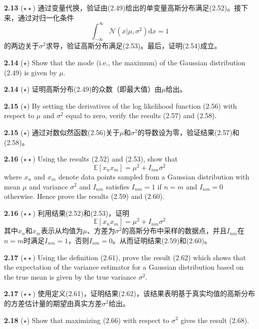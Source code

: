 \documentclass{article}
\begin{document}
\textbf{2.13} ($\star\star$) 通过变量代换，验证由(2.49)给出的单变量高斯分布满足(2.52)。接下来，通过对归一化条件
\begin{equation}
\int_{-\infty}^{\infty} \mathcal{N}\left(x | \mu, \sigma^{2}\right) \mathrm{d} x=1
\tag{2.127}
\end{equation}
的两边关于$\sigma^{2}$求导，验证高斯分布满足(2.53)。最后，证明(2.54)成立。

\textbf{2.14} ($\star$) Show that the mode (i.e., the maximum) of the Gaussian distribution (2.49) is given by $\mu$.

\textbf{2.14} ($\star$) 证明高斯分布(2.49)的众数（即最大值）由$\mu$给出。

\textbf{2.15} ($\star$) By setting the derivatives of the log likelihood function (2.56) with respect to $\mu$ and $\sigma^{2}$ equal to zero, verify the results (2.57) and (2.58).

\textbf{2.15} ($\star$) 通过对数似然函数(2.56)关于$\mu$和$\sigma^{2}$的导数设为零，验证结果(2.57)和(2.58)。

\textbf{2.16} ($\star\star$) Using the results (2.52) and (2.53), show that
\begin{equation}
\mathbb{E}\left[x_{n} x_{m}\right]=\mu^{2}+I_{n m} \sigma^{2}
\tag{2.128}
\end{equation}
where $x_{n}$ and $x_{m}$ denote data points sampled from a Gaussian distribution with mean $\mu$ and variance $\sigma^{2}$ and $I_{nm}$ satisfies $I_{nm}=1$ if $n=m$ and $I_{nm}=0$ otherwise. Hence prove the results (2.59) and (2.60).

\textbf{2.16} ($\star\star$) 利用结果(2.52)和(2.53)，证明
\begin{equation}
\mathbb{E}\left[x_{n} x_{m}\right]=\mu^{2}+I_{n m} \sigma^{2}
\tag{2.128}
\end{equation}
其中$x_{n}$和$x_{m}$表示从均值为$\mu$、方差为$\sigma^{2}$的高斯分布中采样的数据点，并且$I_{nm}$在$n=m$时满足$I_{nm}=1$，否则$I_{nm}=0$。从而证明结果(2.59)和(2.60)。

\textbf{2.17} ($\star\star$) Using the definition (2.61), prove the result (2.62) which shows that the expectation of the variance estimator for a Gaussian distribution based on the true mean is given by the true variance $\sigma^{2}$.

\textbf{2.17} ($\star\star$) 使用定义(2.61)，证明结果(2.62)，该结果表明基于真实均值的高斯分布的方差估计量的期望由真实方差$\sigma^{2}$给出。

\textbf{2.18} ($\star$) Show that maximizing (2.66) with respect to $\sigma^{2}$ gives the result (2.68).
\end{document}
